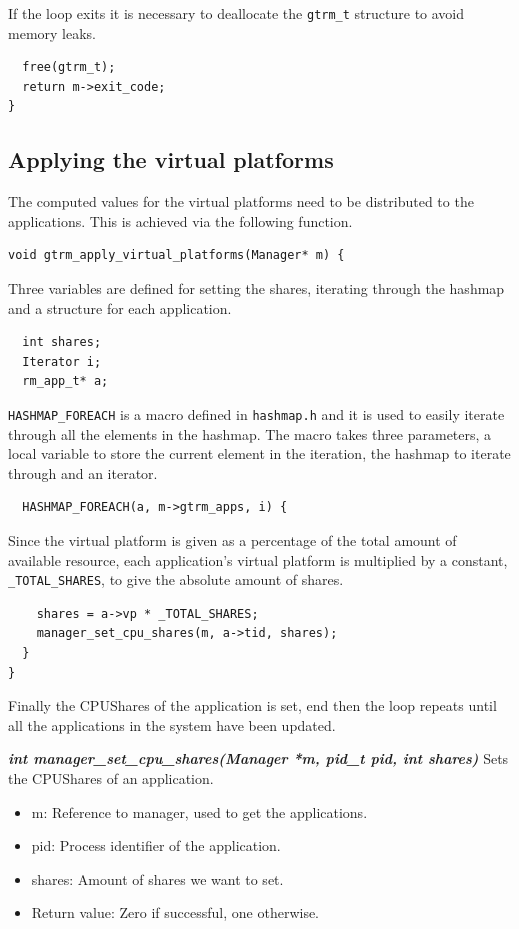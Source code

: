 \documentclass[nobiblatex]{LTHthesis}
\begin{document}
If the loop exits it is necessary to deallocate the \texttt{gtrm\_t} 
structure to avoid memory leaks.
\begin{lstlisting}
  free(gtrm_t);
  return m->exit_code;
}
\end{lstlisting}

\subsection{Applying the virtual platforms}

The computed values for the virtual platforms need to be distributed to 
the applications. This is achieved via the following function.
\begin{lstlisting}
void gtrm_apply_virtual_platforms(Manager* m) {
\end{lstlisting}

Three variables are defined for setting the shares, iterating through 
the hashmap and a structure for each application.
\begin{lstlisting}
  int shares;
  Iterator i;
  rm_app_t* a;
\end{lstlisting}

\texttt{HASHMAP\_FOREACH} is a macro defined in \texttt{hashmap.h} and it is
used to easily iterate through all the elements in the hashmap. 
The macro takes three parameters, a local variable to store the current
element in the iteration, the hashmap to iterate through and an iterator.
\begin{lstlisting}
  HASHMAP_FOREACH(a, m->gtrm_apps, i) {
\end{lstlisting}
Since the virtual platform is given as a percentage of the total amount of
available resource, each application's virtual platform is multiplied by a
constant, \texttt{\_TOTAL\_SHARES}, to give the absolute amount of shares.
\begin{lstlisting}
    shares = a->vp * _TOTAL_SHARES;
    manager_set_cpu_shares(m, a->tid, shares);
  }
}
\end{lstlisting}
Finally the CPUShares of the application is set, end then the loop repeats
until all the applications in the system have been updated.

\begin{framed}
	\begin{flushleft}	
		\textbf{\emph{{int manager\_set\_cpu\_shares(Manager *m, pid\_t pid, int shares)}}} \newline
		Sets the CPUShares of an application.
		\begin{itemize}
		\item m: Reference to manager, used to get the applications.
		\item pid: Process identifier of the application.
		\item shares: Amount of shares we want to set.
		\item Return value: Zero if successful, one otherwise.
		\end{itemize}
	\end{flushleft}	
\end{framed}
\end{document}
